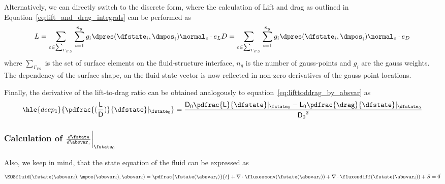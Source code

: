 \documentclass[../main.tex]{subfiles}
\begin{document}
Alternatively, we can directly switch to the discrete form, where the calculation of Lift and drag as outlined in Equation~\eqref{eq:lift_and_drag_integrals} can be performed as
\begin{align}\label{eq:discrete_lift_and_drag_formulas}
L=\sum_{e \in \sum_{\Gamma_{FS}}} \sum_{i=1}^{n_g} g_i \dpres(\dfstate_i,\dmpos_i) \normal_e \cdot e_L
D=\sum_{e \in \sum_{\Gamma_{FS}}} \sum_{i=1}^{n_g} g_i \dpres(\dfstate_i,\dmpos_i) \normal_e \cdot e_D
\end{align}
where $\sum_{\Gamma_{FS}}$ is the set of surface elements on the fluid-structure interface, $n_g$ is the number of gauss-points and $g_i$ are the gauss weights. The dependency of the surface shape, on the fluid state vector is now reflected in non-zero derivatives of the gauss point locations.

Finally, the derivative of the lift-to-drag ratio can be obtained analogously to equation~\eqref{eq:lifttoddrag_by_absvar} as
\begin{align}\label{eq:lifttodrag_by_dfstate}
\hle{deep_1}{\pdfrac{(\frac{\mathsf{L}}{\mathsf{D}})}{\dfstate}\rvert_{\fstate_0}}=
\frac{\mathsf{D}_0 \pdfrac{\mathsf{L}}{\dfstate}\rvert_{\fstate_0} - \mathsf{L}_0 \pdfrac{\drag}{\dfstate}\rvert_{\dfstate_0} }{{\mathsf{D}_0}^2}
\end{align}


\subsubsection{Calculation of $\DfstateBYabsvarI\bigg\rvert_{\fstate_0}$}

Also, we keep in mind, that the state equation of the fluid can be expressed as
\begin{align}
\EOSfluid(\fstate(\absvar_i),\mpos(\absvar_i),\absvar_i)=
\pdfrac{\fstate(\absvar_i)}{t}+\nabla\cdot\fluxesconv(\fstate(\absvar_i))+\nabla\cdot\fluxesdiff(\fstate(\absvar_i))+S=
\vec{0}
\end{align}
\end{document}
